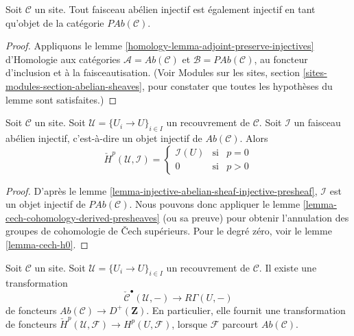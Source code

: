 \begin{lemma}
\label{lemma-injective-abelian-sheaf-injective-presheaf}
Soit $\mathcal{C}$ un site. Tout faisceau abélien injectif est également
injectif en tant qu'objet de la catégorie $\textit{PAb}(\mathcal{C})$.
\end{lemma}

\begin{proof}
Appliquons le lemme \ref{homology-lemma-adjoint-preserve-injectives}
d'Homologie aux catégories $\mathcal{A} = \textit{Ab}(\mathcal{C})$ et
$\mathcal{B} = \textit{PAb}(\mathcal{C})$, au foncteur d'inclusion et à la
faisceautisation. (Voir Modules sur les sites, section
\ref{sites-modules-section-abelian-sheaves}, pour constater que toutes les
hypothèses du lemme sont satisfaites.)
\end{proof}

\begin{lemma}
\label{lemma-injective-trivial-cech}
Soit $\mathcal{C}$ un site.
Soit $\mathcal{U} = \{U_i \to U\}_{i \in I}$ un recouvrement de
$\mathcal{C}$. Soit $\mathcal{I}$ un faisceau abélien injectif, c'est-à-dire
un objet injectif de $\textit{Ab}(\mathcal{C})$. Alors
$$
\check{H}^p(\mathcal{U}, \mathcal{I}) =
\left\{
\begin{matrix}
\mathcal{I}(U) & \text{si} & p = 0 \\
0 & \text{si} & p > 0
\end{matrix}
\right.
$$
\end{lemma}

\begin{proof}
D'après le lemme \ref{lemma-injective-abelian-sheaf-injective-presheaf},
$\mathcal{I}$ est un objet injectif de $\textit{PAb}(\mathcal{C})$.
Nous pouvons donc appliquer le
lemme \ref{lemma-cech-cohomology-derived-presheaves} (ou sa preuve) pour
obtenir l'annulation des groupes de cohomologie de {\v C}ech supérieurs.
Pour le degré zéro, voir le lemme \ref{lemma-cech-h0}.
\end{proof}

\begin{lemma}
\label{lemma-cech-cohomology}
Soit $\mathcal{C}$ un site.
Soit $\mathcal{U} = \{U_i \to U\}_{i \in I}$ un recouvrement de
$\mathcal{C}$. Il existe une transformation
$$
\check{\mathcal{C}}^\bullet(\mathcal{U}, -)
\longrightarrow
R\Gamma(U, -)
$$
de foncteurs $\textit{Ab}(\mathcal{C}) \to D^{+}(\mathbf{Z})$.
En particulier, elle fournit une transformation de foncteurs
$\check{H}^p(\mathcal{U}, \mathcal{F}) \to H^p(U, \mathcal{F})$, lorsque
$\mathcal{F}$ parcourt $\textit{Ab}(\mathcal{C})$.
\end{lemma}

